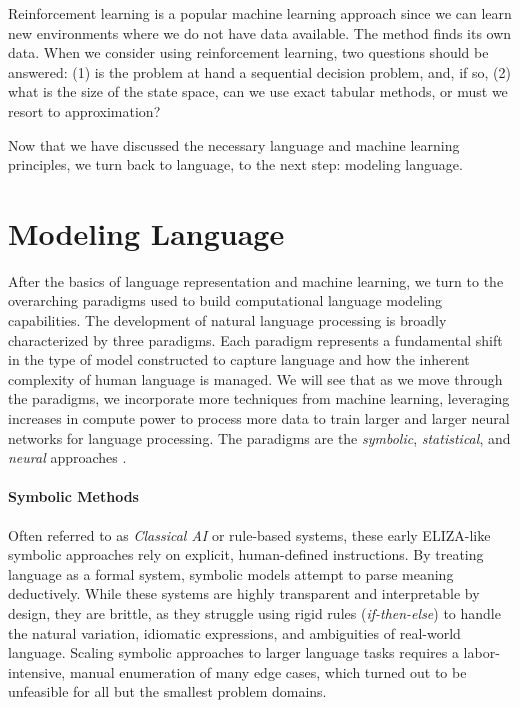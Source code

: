 Reinforcement learning is a popular machine learning approach since we can learn new environments where we do not have data available. The method finds its own data. %
When we consider using reinforcement learning, two questions should be answered: (1) is the problem at hand a sequential decision problem, and, if so, (2) what is the size of the state space, can we use exact tabular methods, or must we resort to approximation?



Now that we have discussed the necessary language and machine learning principles, we turn back to language, to the next step: modeling language.  

\section{Modeling Language}\label{sec:modernNLP}
After the basics of language representation and machine learning, we turn to the overarching paradigms used to build  computational language modeling capabilities. The development of natural language processing is broadly characterized by three paradigms. Each paradigm represents a fundamental shift in the type of model constructed to capture language and how the inherent complexity of human language is managed. We will see that as we move through the paradigms, we incorporate more techniques from machine learning, leveraging  increases in compute power to process more data to train larger and larger neural networks for language processing. The paradigms are the \textit{symbolic}, \textit{statistical}, and  \textit{neural} approaches \citep{kautz2020third, deng2018deep}.

\paragraph{Symbolic Methods} Often referred to as \textit{Classical AI} or rule-based systems, these early ELIZA-like symbolic approaches rely on explicit, human-defined instructions. By treating language as a formal system, symbolic models attempt to parse meaning deductively. While these systems are highly transparent and interpretable by design, they are brittle, as they struggle using rigid rules (\textit{if-then-else}) to handle the natural variation, idiomatic expressions, and ambiguities of real-world language. Scaling symbolic approaches to larger language tasks requires a labor-intensive, manual enumeration of many edge cases, which turned out to be unfeasible for all but the smallest problem domains.

